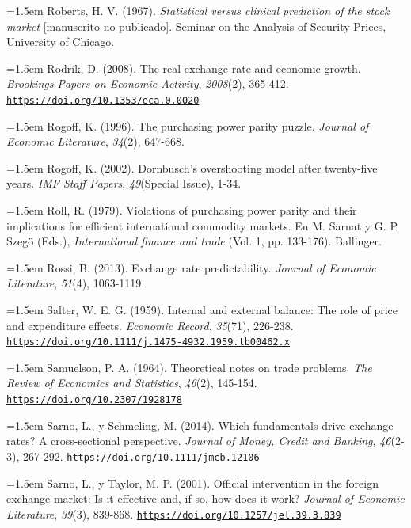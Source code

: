 \documentclass[10pt,a4paper]{article}
\begin{document}
\noindent\hangindent=1.5em Roberts, H. V. (1967). \textit{Statistical versus clinical prediction of the stock market} [manuscrito no publicado]. Seminar on the Analysis of Security Prices, University of Chicago.

\noindent\hangindent=1.5em Rodrik, D. (2008). The real exchange rate and economic growth. \textit{Brookings Papers on Economic Activity}, \textit{2008}(2), 365-412. \href{https://doi.org/10.1353/eca.0.0020}{\nolinkurl{https://doi.org/10.1353/eca.0.0020}}

\noindent\hangindent=1.5em Rogoff, K. (1996). The purchasing power parity puzzle. \textit{Journal of Economic Literature}, \textit{34}(2), 647-668.

\noindent\hangindent=1.5em Rogoff, K. (2002). Dornbusch's overshooting model after twenty-five years. \textit{IMF Staff Papers}, \textit{49}(Special Issue), 1-34.

\noindent\hangindent=1.5em Roll, R. (1979). Violations of purchasing power parity and their implications for efficient international commodity markets. En M. Sarnat y G. P. Szegö (Eds.), \textit{International finance and trade} (Vol. 1, pp. 133-176). Ballinger.

\noindent\hangindent=1.5em Rossi, B. (2013). Exchange rate predictability. \textit{Journal of Economic Literature}, \textit{51}(4), 1063-1119.

\noindent\hangindent=1.5em Salter, W. E. G. (1959). Internal and external balance: The role of price and expenditure effects. \textit{Economic Record}, \textit{35}(71), 226-238. \href{https://doi.org/10.1111/j.1475-4932.1959.tb00462.x}{\nolinkurl{https://doi.org/10.1111/j.1475-4932.1959.tb00462.x}}

\noindent\hangindent=1.5em Samuelson, P. A. (1964). Theoretical notes on trade problems. \textit{The Review of Economics and Statistics}, \textit{46}(2), 145-154. \href{https://doi.org/10.2307/1928178}{\nolinkurl{https://doi.org/10.2307/1928178}}

\noindent\hangindent=1.5em Sarno, L., y Schmeling, M. (2014). Which fundamentals drive exchange rates? A cross-sectional perspective. \textit{Journal of Money, Credit and Banking}, \textit{46}(2-3), 267-292. \href{https://doi.org/10.1111/jmcb.12106}{\nolinkurl{https://doi.org/10.1111/jmcb.12106}}

\noindent\hangindent=1.5em Sarno, L., y Taylor, M. P. (2001). Official intervention in the foreign exchange market: Is it effective and, if so, how does it work? \textit{Journal of Economic Literature}, \textit{39}(3), 839-868. \href{https://doi.org/10.1257/jel.39.3.839}{\nolinkurl{https://doi.org/10.1257/jel.39.3.839}}
\end{document}

